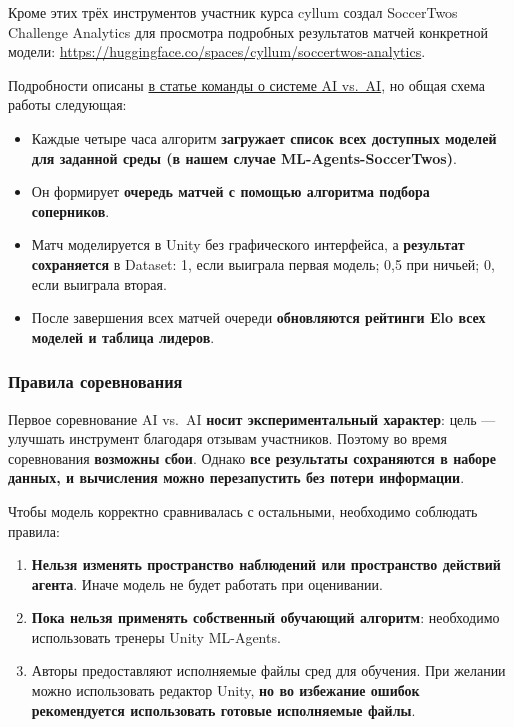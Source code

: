 \documentclass[11pt,a4paper]{article}
\begin{document}
Кроме этих трёх инструментов участник курса cyllum создал SoccerTwos Challenge Analytics для просмотра подробных результатов матчей конкретной модели: \url{https://huggingface.co/spaces/cyllum/soccertwos-analytics}.

Подробности описаны \href{https://huggingface.co/blog/aivsai}{в статье команды о системе AI vs.~AI}, но общая схема работы следующая:

\begin{itemize}
\tightlist
\item
  Каждые четыре часа алгоритм \textbf{загружает список всех доступных моделей для заданной среды (в нашем случае ML-Agents-SoccerTwos)}.
\item
  Он формирует \textbf{очередь матчей с помощью алгоритма подбора соперников}.
\item
  Матч моделируется в Unity без графического интерфейса, а \textbf{результат сохраняется} в Dataset: 1, если выиграла первая модель; 0,5 при ничьей; 0, если выиграла вторая.
\item
  После завершения всех матчей очереди \textbf{обновляются рейтинги Elo всех моделей и таблица лидеров}.
\end{itemize}

\subsubsection{Правила соревнования}\label{competition-rules}

Первое соревнование AI vs.~AI \textbf{носит экспериментальный характер}: цель --- улучшать инструмент благодаря отзывам участников. Поэтому во время соревнования \textbf{возможны сбои}. Однако \textbf{все результаты сохраняются в наборе данных, и вычисления можно перезапустить без потери информации}.

Чтобы модель корректно сравнивалась с остальными, необходимо соблюдать правила:

\begin{enumerate}
\def\labelenumi{\arabic{enumi}.}
\tightlist
\item
  \textbf{Нельзя изменять пространство наблюдений или пространство действий агента}. Иначе модель не будет работать при оценивании.
\item
  \textbf{Пока нельзя применять собственный обучающий алгоритм}: необходимо использовать тренеры Unity ML-Agents.
\item
  Авторы предоставляют исполняемые файлы сред для обучения. При желании можно использовать редактор Unity, \textbf{но во избежание ошибок рекомендуется использовать готовые исполняемые файлы}.
\end{enumerate}
\end{document}
